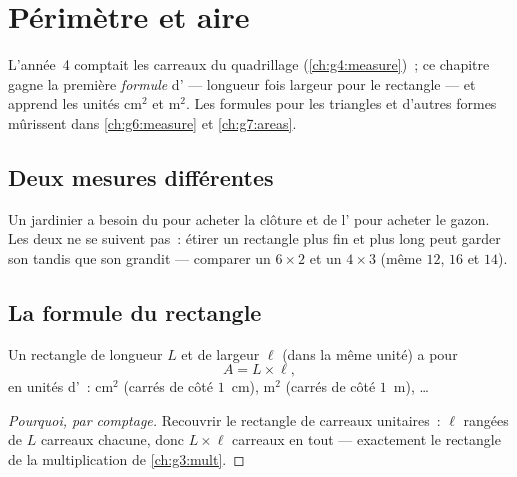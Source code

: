 \chapter{Périmètre et aire}\label{ch:g5:areas}

L'année~4 comptait les carreaux du quadrillage
(\cref{ch:g4:measure})~; ce chapitre gagne la première
\emph{formule} d' --- longueur fois largeur pour le rectangle ---
et apprend les unités cm$^2$ et m$^2$. Les formules pour les
triangles et d'autres formes mûrissent dans \cref{ch:g6:measure} et
\cref{ch:g7:areas}.

\section{Deux mesures différentes}

\begin{example}\label{ex:g5:areas:contrast}
Un jardinier a besoin du \emph{} pour acheter la clôture et
de l'\emph{} pour acheter le gazon. Les deux ne se suivent
pas~: étirer un rectangle plus fin et plus long peut garder son
 tandis que son  grandit --- comparer un
$6 \times 2$ et un $4 \times 3$ (même  $12$,  $16$ et
$14$).
\end{example}

\section{La formule du rectangle}

\begin{proposition}\label{prop:g5:areas:rectangle}
Un rectangle de longueur $L$ et de largeur $\ell$ (dans la même
unité) a pour 
\[
A = L \times \ell ,
\]
en unités d'~: cm$^2$ (carrés de côté $1$~cm), m$^2$ (carrés de
côté $1$~m), \dots
\end{proposition}

\begin{proof}[Pourquoi, par comptage]
Recouvrir le rectangle de carreaux unitaires~: $\ell$ rangées de
$L$ carreaux chacune, donc $L \times \ell$ carreaux en tout ---
exactement le rectangle de la multiplication de \cref{ch:g3:mult}.
\end{proof}

